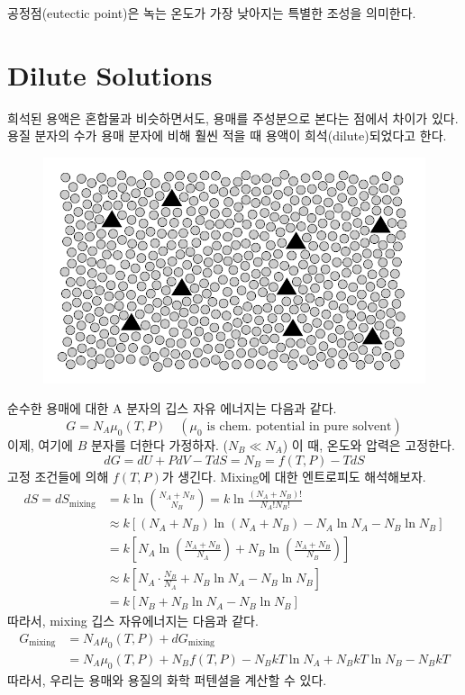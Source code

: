 \documentclass{article}
\begin{document}
공정점(eutectic point)은 녹는 온도가 가장 낮아지는 특별한 조성을 의미한다.

\newpage

\section{Dilute Solutions}

희석된 용액은 혼합물과 비슷하면서도, 용매를 주성분으로 본다는 점에서 차이가 있다. 용질 분자의 수가 용매 분자에 비해 훨씬 적을 때 용액이 희석(dilute)되었다고 한다. 

\begin{figure}[h]
    \centering
    \includegraphics[width=0.4\linewidth]{images/fig5_1.png}
\end{figure}


순수한 용매에 대한 A 분자의 깁스 자유 에너지는 다음과 같다.
\begin{equation}
    G = N_A \mu_0 (T,P) \quad (\mu_0 \text{ is chem. potential in pure solvent})
\end{equation}
이제, 여기에 $B$ 분자를 더한다 가정하자. ($N_B \ll N_A$) 이 때, 온도와 압력은 고정한다.
\begin{equation}
    dG = dU + PdV - TdS = N_B = f(T,P) -TdS
\end{equation}
고정 조건들에 의해 $f(T,P)$가 생긴다. Mixing에 대한 엔트로피도 해석해보자.
\begin{align}
    dS = dS_{\text{mixing}} &= k \ln \binom{N_A + N_B}{N_B} = k \ln \frac{(N_A + N_B)!}{N_A ! N_B !}\\
    &\approx k [ (N_A + N_B) \ln (N_A + N_B) - N_A \ln N_A - N_B \ln N_B]\\
    &= k \left[ N_A \ln \left( \frac{N_A + N_B}{N_A} \right) + N_B \ln \left( \frac{N_A + N_B}{N_B} \right) \right]\\
    &\approx k \left[ N_A \cdot \frac{N_B}{N_A} + N_B \ln N_A - N_B \ln N_B \right]\\
    &= k [N_B + N_B \ln N_A - N_B \ln N_B]
\end{align}
따라서, mixing 깁스 자유에너지는 다음과 같다.
\begin{align}
    G_{\text{mixing}} &= N_A \mu_0 (T,P) + dG_{\text{mixing}}\\
    &= N_A \mu_0 (T,P) + N_B f(T,P) - N_B kT \ln N_A + N_B kT \ln N_B - N_B kT
\end{align}
따라서, 우리는 용매와 용질의 화학 퍼텐셜을 계산할 수 있다.
\end{document}
